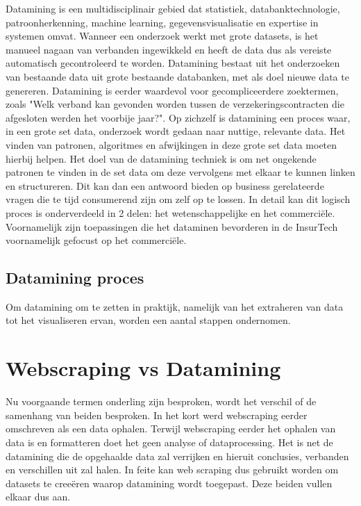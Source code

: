 Datamining is een multidisciplinair gebied dat statistiek, databanktechnologie, patroonherkenning, machine learning, gegevensvisualisatie en expertise in systemen omvat.
Wanneer een onderzoek werkt met grote datasets, is het manueel nagaan van verbanden ingewikkeld en heeft de data dus als vereiste automatisch gecontroleerd te worden.
Datamining bestaat uit het onderzoeken van bestaande data uit grote bestaande databanken, met als doel nieuwe data te genereren. Datamining is eerder waardevol voor gecompliceerdere zoektermen, zoals "Welk verband kan gevonden worden tussen de verzekeringscontracten die afgesloten werden het voorbije jaar?".
Op zichzelf is datamining een proces waar, in een grote set data, onderzoek wordt gedaan naar nuttige, relevante data. Het vinden van patronen, algoritmes en afwijkingen in deze grote set data moeten hierbij helpen. Het doel van de datamining techniek is om net ongekende patronen te vinden in de set data om deze vervolgens met elkaar te kunnen linken en structureren. Dit kan dan een antwoord bieden op business gerelateerde vragen die te tijd consumerend zijn om zelf op te lossen. \autocite{osman2019data} In detail kan dit logisch proces is onderverdeeld in 2 delen: het wetenschappelijke en het commerciële. Voornamelijk zijn toepassingen die het dataminen bevorderen in de InsurTech voornamelijk gefocust op het commerciële. \autocite{hand2007principles}

\subsection{Datamining proces}

Om datamining om te zetten in praktijk, namelijk van het extraheren van data tot het visualiseren ervan, worden een aantal stappen ondernomen.


\section{Webscraping vs Datamining}

Nu voorgaande termen onderling zijn besproken, wordt het verschil of de samenhang van beiden besproken. In het kort werd webscraping eerder omschreven als een data ophalen. Terwijl webscraping eerder het ophalen van data is en formatteren doet het geen analyse of dataprocessing. Het is net de datamining die de opgehaalde data zal verrijken en hieruit conclusies, verbanden en verschillen uit zal halen. In feite kan web scraping dus gebruikt worden om datasets te creeëren waarop datamining wordt toegepast. Deze beiden vullen elkaar dus aan.



